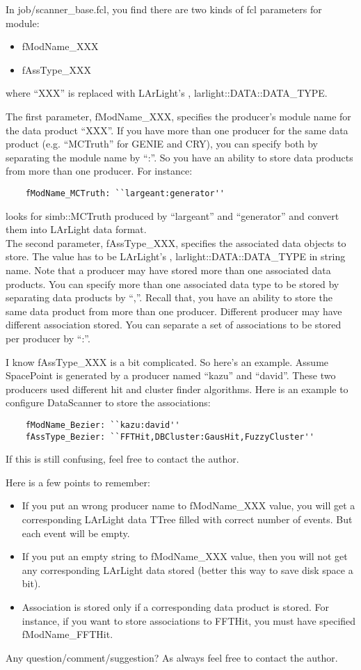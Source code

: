 In {\ttfamily job/scanner\_base.fcl}, you find there are two kinds of fcl parameters for \DataScanner module:
\begin{itemize}
\item fModName\_XXX
\item fAssType\_XXX
\end{itemize}
where ``XXX'' is replaced with LArLight's \enum, {\ttfamily larlight::DATA::DATA\_TYPE}.

The first parameter, {\ttfamily fModName\_XXX}, specifies the producer's module name for the data product ``XXX''. If you have more than one producer for the same data product (e.g. ``MCTruth'' for GENIE and CRY), you can specify both by separating the module name by ``:''. So you have an ability to store data products from more than one producer. For instance:
\begin{lstlisting}
    fModName_MCTruth: ``largeant:generator''
\end{lstlisting}
looks for {\ttfamily simb::MCTruth} produced by ``largeant'' and ``generator'' and convert them into LArLight data format.\\

The second parameter, {\ttfamily fAssType\_XXX}, specifies the associated data objects to store. The value has to be LArLight's \enum, {\ttfamily larlight::DATA::DATA\_TYPE} in string name. Note that a producer may have stored more than one associated data products. You can specify more than one associated data type to be stored by separating data products by ``,''. Recall that, you have an ability to store the same data product from more than one producer. Different producer may have different association stored. You can separate a set of associations to be stored per producer by ``:''. 

I know {\ttfamily fAssType\_XXX} is a bit complicated. So here's an example. Assume {\ttfamily SpacePoint} is generated by a producer named ``kazu'' and ``david''. These two producers used different hit and cluster finder algorithms. Here is an example to configure DataScanner to store the associations:
\begin{lstlisting}
    fModName_Bezier: ``kazu:david''
    fAssType_Bezier: ``FFTHit,DBCluster:GausHit,FuzzyCluster''
\end{lstlisting}
If this is still confusing, feel free to contact the author.

Here is a few points to remember:
\begin{itemize}
\item If you put an wrong producer name to {\ttfamily fModName\_XXX} value, you will get a corresponding LArLight data {\ttfamily TTree} filled with correct number of events. But each event will be empty.
\item If you put an empty string to {\ttfamily fModName\_XXX} value, then you will not get any corresponding LArLight data stored (better this way to save disk space a bit).
\item Association is stored only if a corresponding data product is stored. For instance, if you want to store associations to {\ttfamily FFTHit}, you must have specified {\ttfamily fModName\_FFTHit}.
\end{itemize}

Any question/comment/suggestion? As always feel free to contact the author.

